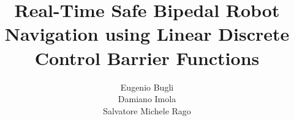 \documentclass[12pt,a4paper,oneside]{article}
\title{Real-Time Safe Bipedal Robot Navigation using Linear Discrete Control Barrier Functions} %
\author{Eugenio Bugli \\ Damiano Imola \\ Salvatore Michele Rago} %
\theoremstyle{definition}
\begin{document}
\sloppy


\newpage

\tableofcontents
\newpage


\clearpage


\clearpage


\clearpage


\clearpage


\clearpage


\clearpage



\nocite{*}  %
\end{document}
